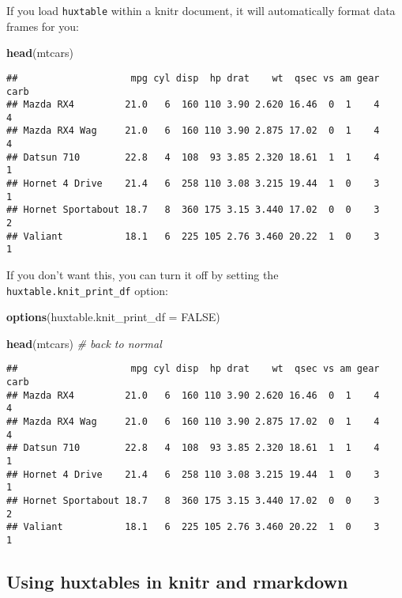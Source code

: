 \documentclass[]{article}
\newenvironment{Shaded}{\begin{snugshade}}{\end{snugshade}}
\newcommand{\CommentTok}[1]{\textcolor[rgb]{0.56,0.35,0.01}{\textit{#1}}}
\newcommand{\DataTypeTok}[1]{\textcolor[rgb]{0.13,0.29,0.53}{#1}}
\newcommand{\KeywordTok}[1]{\textcolor[rgb]{0.13,0.29,0.53}{\textbf{#1}}}
\newcommand{\NormalTok}[1]{#1}
\newcommand{\OtherTok}[1]{\textcolor[rgb]{0.56,0.35,0.01}{#1}}
\begin{document}
If you load \texttt{huxtable} within a knitr document, it will
automatically format data frames for you:

\begin{Shaded}
\begin{Highlighting}[]
\KeywordTok{head}\NormalTok{(mtcars)}
\end{Highlighting}
\end{Shaded}

\begin{verbatim}
##                    mpg cyl disp  hp drat    wt  qsec vs am gear carb
## Mazda RX4         21.0   6  160 110 3.90 2.620 16.46  0  1    4    4
## Mazda RX4 Wag     21.0   6  160 110 3.90 2.875 17.02  0  1    4    4
## Datsun 710        22.8   4  108  93 3.85 2.320 18.61  1  1    4    1
## Hornet 4 Drive    21.4   6  258 110 3.08 3.215 19.44  1  0    3    1
## Hornet Sportabout 18.7   8  360 175 3.15 3.440 17.02  0  0    3    2
## Valiant           18.1   6  225 105 2.76 3.460 20.22  1  0    3    1
\end{verbatim}

\FloatBarrier

If you don't want this, you can turn it off by setting the
\texttt{huxtable.knit\_print\_df} option:

\begin{Shaded}
\begin{Highlighting}[]
\KeywordTok{options}\NormalTok{(}\DataTypeTok{huxtable.knit_print_df =} \OtherTok{FALSE}\NormalTok{)}

\KeywordTok{head}\NormalTok{(mtcars) }\CommentTok{# back to normal}
\end{Highlighting}
\end{Shaded}

\begin{verbatim}
##                    mpg cyl disp  hp drat    wt  qsec vs am gear carb
## Mazda RX4         21.0   6  160 110 3.90 2.620 16.46  0  1    4    4
## Mazda RX4 Wag     21.0   6  160 110 3.90 2.875 17.02  0  1    4    4
## Datsun 710        22.8   4  108  93 3.85 2.320 18.61  1  1    4    1
## Hornet 4 Drive    21.4   6  258 110 3.08 3.215 19.44  1  0    3    1
## Hornet Sportabout 18.7   8  360 175 3.15 3.440 17.02  0  0    3    2
## Valiant           18.1   6  225 105 2.76 3.460 20.22  1  0    3    1
\end{verbatim}

\FloatBarrier

\hypertarget{using-huxtables-in-knitr-and-rmarkdown}{%
\subsection{Using huxtables in knitr and
rmarkdown}\label{using-huxtables-in-knitr-and-rmarkdown}}
\end{document}
